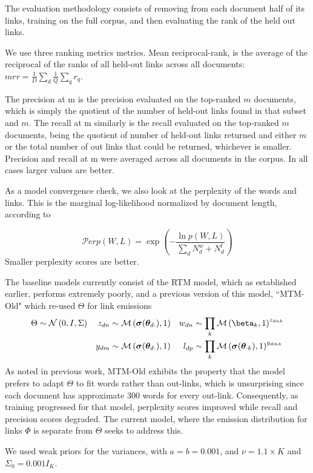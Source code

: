 The evaluation methodology consists of removing from each document half of its links, training on the full corpus, and then evaluating the rank of the held out links.

We use three ranking metrics metrics. Mean reciprocal-rank, is the average of the reciprocal of the ranks of all held-out links across all documents: $mrr = \frac{1}{D} \sum_d \frac{1}{Q} \sum_q r_q$.  

The precision at m is the precision evaluated on the top-ranked $m$ documents, which is simply the quotient of the number of held-out links found in that subset and $m$. The recall at m similarly is the recall evaluated on the top-ranked $m$ documents, being the quotient of number of held-out links returned and either $m$ or the total number of out links that could be returned, whichever is smaller. Precision and recall at m were averaged across all documents in the corpus. In all cases larger values are better.

As a model convergence check, we also look at the perplexity of the words and links. This is the marginal log-likelihood normalized by document length, according to 

\begin{equation}
\mathcal{P}erp(W,L) = \exp\left( - \frac{\ln p(W,L)}{\sum_d N^w_d + N^l_d} \right)
\end{equation}
Smaller perplexity scores are better.

The baseline models currently consist of the RTM model, which as established earlier, performs extremely poorly, and a previous version of this model, ``MTM-Old" which re-used $\Theta$ for link emissions
\begin{align}
\Theta & \sim \mnor{0}{I}{\Sigma} &
z_{dn} & \sim \muln{\vv{\sigma}(\thdo)}{1} &
w_{dn} & \sim \prod_k \muln{\vv{\beta}_k}{1}^{z_{dnk}} \\
& &
y_{dm} & \sim \muln{\vv{\sigma}(\thdo)}{1} &
l_{dp} & \sim \prod_k \muln{\vv{\sigma}(\thok)}{1}^{y_{dmk}}
\end{align}
As noted in previous work, MTM-Old exhibits the property that the model prefers to adapt $\Theta$ to fit words rather than out-links, which is unsurprising since each document has approximate 300 words for every out-link. Consequently, as training progressed for that model, perplexity scores improved while recall and precision scores degraded. The current model, where the emission distribution for links $\Phi$ is separate from $\Theta$ seeks to address this.

We used weak priors for the variances, with $a = b = 0.001$, and $\nu = 1.1 \times K$ and $\Sigma_0 = 0.001 I_K$.

